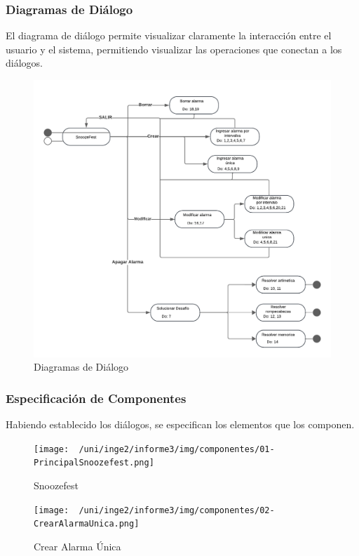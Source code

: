 \subsubsection{Diagramas de Diálogo}
El diagrama de diálogo permite visualizar claramente la interacción entre el usuario y el sistema, permitiendo visualizar las operaciones que conectan a los diálogos.
\begin{figure}[H]
	\centering
	\includegraphics[page=1,width=\textwidth]{./img/dialogos.pdf}
	\caption{Diagramas de Diálogo}
        \vspace{10pt}
	\label{fig:Diagrama de Diálogos}
\end{figure}
\newpage
\subsubsection{Especificación de Componentes}
Habiendo establecido los diálogos, se especifican los elementos que los componen.

\begin{figure}[H]
	\centering
	\texttt{[image: ~/uni/inge2/informe3/img/componentes/01-PrincipalSnoozefest.png]}
	\caption{Snoozefest}
        \vspace{5pt}
	\label{fig:Snoozefest}
\end{figure}

\begin{figure}[H]
	\centering
	\texttt{[image: ~/uni/inge2/informe3/img/componentes/02-CrearAlarmaUnica.png]}
	\caption{Crear Alarma Única}
        \vspace{5pt}
	\label{fig:Crear Alarma Única}
\end{figure}

